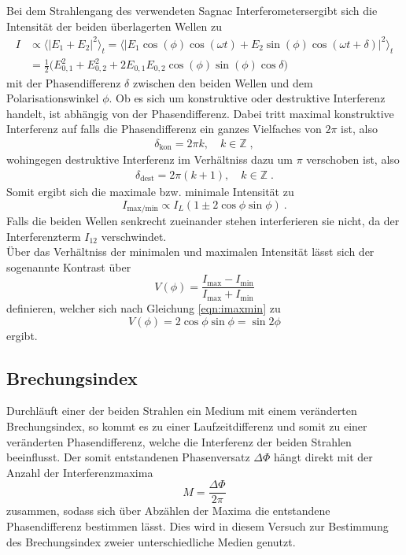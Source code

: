 Bei dem Strahlengang des verwendeten Sagnac Interferometersergibt sich die Intensität der beiden überlagerten Wellen zu
\begin{align}
  I &\propto \langle \lvert
  E_1+E_2 \rvert^2 \rangle_t =
  \langle \lvert E_1 \cos{(\phi)}\cos{(\omega t)} + E_2 \sin{(\phi)}\cos{(\omega t + \delta)} \rvert^2 \rangle_t \\
  &= \frac{1}{2} \bigl( E_{0,1}^2 + E_{0,2}^2 + 2E_{0,1}E_{0,2}\cos(\phi)\sin(\phi)\cos{\delta} \bigr)
\end{align}
mit der Phasendifferenz $\delta$ zwischen den beiden Wellen und dem  Polarisationswinkel $\phi$.
Ob es sich um konstruktive oder destruktive Interferenz handelt, ist abhängig von der Phasendifferenz.
Dabei tritt maximal konstruktive Interferenz auf falls die Phasendifferenz ein ganzes Vielfaches von $2\pi$
ist, also
\begin{align*}
  \delta_{\text{kon}}=2\pi k, \quad k \in \mathbb{Z} \; ,
\end{align*}
wohingegen destruktive Interferenz im Verhältniss dazu um $\pi$ verschoben ist, also
\begin{align*}
  \delta_{\text{dest}}=2\pi(k+1), \quad k \in \mathbb{Z}  \; .
\end{align*}
Somit ergibt sich die maximale bzw. minimale Intensität zu
\begin{equation}
  I_{\text{max/min}} \propto I_{L}(1\pm 2\cos{\phi}\sin{\phi}) \: .
  \label{eqn:imaxmin}
\end{equation}
Falls die beiden Wellen senkrecht zueinander stehen
interferieren sie nicht, da der Interferenzterm $I_{12}$ verschwindet.\\
Über das Verhältniss der minimalen und maximalen Intensität lässt sich der sogenannte Kontrast
über
\begin{equation}
  V(\phi)= \frac{I_{\text{max}}-I_{\text{min}}}{I_{\text{max}}+I_{\text{min}}}
\end{equation}
definieren, welcher sich nach Gleichung \eqref{eqn:imaxmin} zu
\begin{equation}
  V(\phi)=2\cos{\phi}\sin{\phi}=\sin{2\phi}
\end{equation}
ergibt.
\subsection{Brechungsindex}

Durchläuft einer der beiden Strahlen ein Medium mit einem veränderten Brechungsindex, so
kommt es zu einer Laufzeitdifferenz und somit zu einer veränderten Phasendifferenz,
welche die Interferenz der beiden Strahlen beeinflusst.
Der somit entstandenen Phasenversatz $\Delta \Phi$
hängt direkt mit der Anzahl der Interferenzmaxima
\begin{equation}
  M=\frac{\Delta \Phi}{2\pi}
  \label{eqn:AnzMax}
\end{equation}
zusammen, sodass sich über Abzählen der Maxima die entstandene Phasendifferenz bestimmen lässt.
Dies wird in diesem Versuch zur Bestimmung des Brechungsindex zweier unterschiedliche Medien genutzt.
